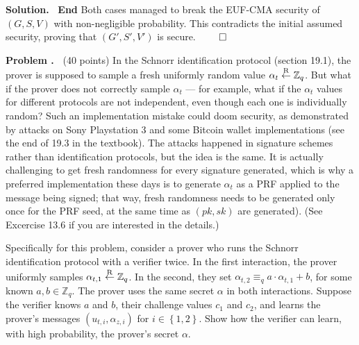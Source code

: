 \documentclass[12pt]{article}
\theoremstyle{definition}
\newcommand{\addbigskip}{\addvspace{\bigskipamount}}
\newcounter{problemnum}
\newenvironment{problem}
     {\addbigskip \setcounter{partnum}{0}
      \noindent\stepcounter{problemnum}\textbf{Problem
                                             \arabic{problemnum}.\ }}
     {\par\addbigskip}
\newenvironment{solution}
     {\addbigskip
      \noindent\color{blue}\textbf{Solution.\ }}
     {\par\addbigskip}
\newenvironment{solution}
     {\comment}
     {\endcomment}
\newcounter{partnum}
\newcommand{\pk}{\mathit{pk}}
\newcommand{\sk}{\mathit{sk}}
\newcommand{\rfrom}{\buildrel{\scriptstyle{\mathrm{R}}}\over{\leftarrow}}
\begin{document}
\begin{solution}
\noindent\textbf{End}
Both cases managed to break the EUF-CMA security of $(G, S, V)$
with non-negligible probability. This contradicts the initial assumed security, proving that $(G', S', V')$ is secure. $\qed$
\end{solution}


\begin{problem} (40 points)
In the Schnorr identification protocol (section 19.1), the prover is supposed to sample a fresh uniformly random value $\alpha_t  \rfrom \mathbb{Z}_q$. But what if the prover does not correctly sample  $\alpha_t$ --- for example, what if the $\alpha_t$ values for different protocols are not independent, even though each one is individually random? Such an implementation mistake could doom security, as demonstrated by attacks on Sony Playstation 3 and some Bitcoin wallet implementations (see the end of 19.3 in the textbook). The attacks happened in signature schemes rather than identification protocols, but the idea is the same. It is actually challenging to get fresh randomness for every signature generated, which is why a preferred implementation these days is to generate $\alpha_t$ as a PRF applied to the message being signed; that way, fresh randomness needs to be generated only once for the PRF seed, at the same time as $(\pk, \sk)$ are generated). (See Excercise 13.6 if you are interested in the details.)

Specifically for this problem, consider a prover who runs the Schnorr identification protocol with a verifier twice. In the first interaction, the prover uniformly samples $\alpha_{t,1} \rfrom \mathbb{Z}_q$. In the second, they set $\alpha _{t,2} \equiv_q a \cdot \alpha _{t,1} + b$, for some known $a,b \in \mathbb{Z}_q$. The prover uses the same secret $\alpha $ in both interactions. Suppose the verifier knows $a$ and $b$, their challenge values $c_1$ and $c_2$, and learns the prover's messages $(u_{t,i}, \alpha _{z,i})$ for $i\in \left\{1,2 \right\}$. Show how the verifier can learn, with high probability, the prover's secret $\alpha $.
\end{problem}
\end{document}
